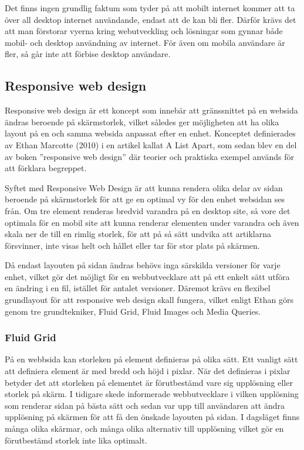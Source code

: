 \documentclass[11pt]{article}
\begin{document}
Det finns ingen grundlig faktum som tyder på att mobilt internet kommer att ta över all desktop internet användande, endast att de kan bli fler. Därför krävs det att man förstorar vyerna kring webutveckling och lösningar som gynnar både mobil- och desktop användning av internet. För även om mobila användare är fler, så går inte att förbise desktop användare.

\subsection{Responsive web design}

Responsive web design är ett koncept som innebär att gränssnittet på en websida ändras beroende på skärmstorlek, vilket således ger möjligheten att ha olika layout på en och samma websida anpassat efter en enhet. Konceptet definierades av Ethan Marcotte (2010) i en artikel kallat A List Apart, som sedan blev en del av boken ”responsive web design” där teorier och praktiska exempel används för att förklara begreppet. 

Syftet med Responsive Web Design är att kunna rendera olika delar av sidan beroende på skärmstorlek för att ge en optimal vy för den enhet websidan ses från. Om tre element renderas bredvid varandra på en desktop site, så vore det optimala för en mobil site att kunna renderar elementen under varandra och även skala ner de till en rimlig storlek, för att på så sätt undvika att artiklarna försvinner, inte visas helt och hållet eller tar för stor plats på skärmen.

Då endast layouten på sidan ändras behövs inga särskilda versioner för varje enhet, vilket gör det möjligt för en webbutvecklare att på ett enkelt sätt utföra en ändring i en fil, istället för antalet versioner. Däremot krävs en flexibel grundlayout för att responsive web design skall fungera, vilket enligt Ethan görs genom tre grundtekniker, Fluid Grid, Fluid Images och Media Queries.

\subsubsection{Fluid Grid}
På en webbsida kan storleken på element definieras på olika sätt. Ett vanligt sätt att definiera element är med bredd och höjd i pixlar. När det definieras i pixlar betyder det att storleken på elementet är förutbestämd vare sig upplösning eller storlek på skärm. I tidigare skede informerade webbutvecklare i vilken upplösning som renderar sidan på bästa sätt och sedan var upp till användaren att ändra upplösning på skärmen för att få den önskade layouten på sidan. I dagsläget finns många olika skärmar, och många olika alternativ till upplösning vilket gör en förutbestämd storlek inte lika optimalt. 
\end{document}

